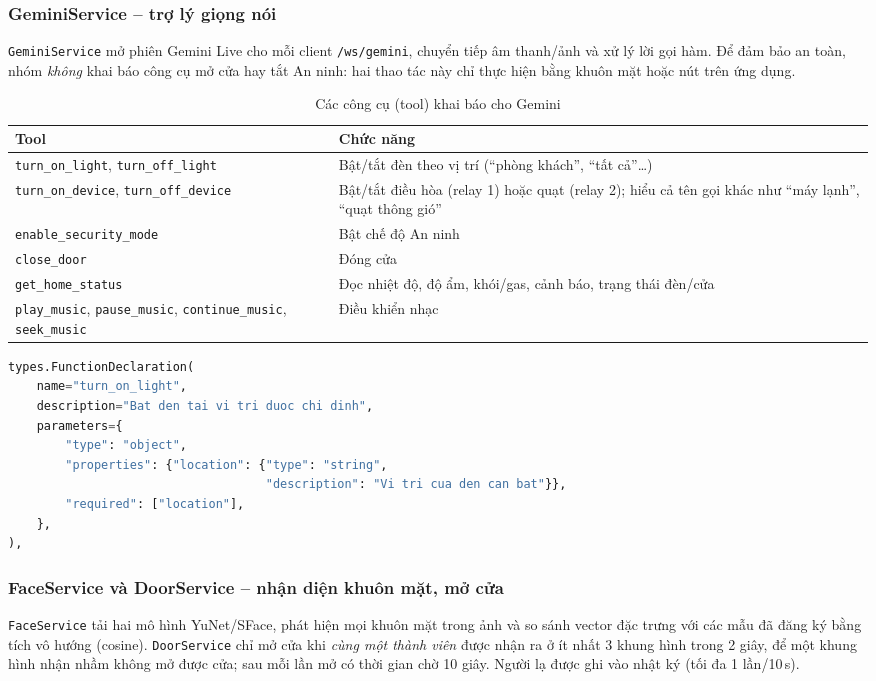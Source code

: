 \documentclass[12pt,a4paper]{extarticle}
\newcommand{\hang}{}  %
\begin{document}
\subsubsection{GeminiService -- trợ lý giọng nói}
\texttt{GeminiService} mở phiên Gemini Live cho mỗi client \texttt{/ws/gemini}, chuyển tiếp âm thanh/ảnh và xử lý lời gọi hàm. Để đảm bảo an toàn, nhóm \emph{không} khai báo công cụ mở cửa hay tắt An ninh: hai thao tác này chỉ thực hiện bằng khuôn mặt hoặc nút trên ứng dụng.

\begin{table}[H]
\centering
\begin{tabularx}{\linewidth}{|p{4.4cm}|L|}
\hline
\hang \textbf{Tool} & \textbf{Chức năng} \\ \hline
\texttt{turn\_on\_light}, \texttt{turn\_off\_light} & Bật/tắt đèn theo vị trí (``phòng khách'', ``tất cả''\ldots) \\ \hline
\texttt{turn\_on\_device}, \texttt{turn\_off\_device} & Bật/tắt điều hòa (relay 1) hoặc quạt (relay 2); hiểu cả tên gọi khác như ``máy lạnh'', ``quạt thông gió'' \\ \hline
\texttt{enable\_security\_mode} & Bật chế độ An ninh \\ \hline
\texttt{close\_door} & Đóng cửa \\ \hline
\texttt{get\_home\_status} & Đọc nhiệt độ, độ ẩm, khói/gas, cảnh báo, trạng thái đèn/cửa \\ \hline
\texttt{play\_music}, \texttt{pause\_music}, \texttt{continue\_music}, \texttt{seek\_music} & Điều khiển nhạc \\ \hline
\end{tabularx}
\caption{Các công cụ (tool) khai báo cho Gemini}
\label{tab:tools}
\end{table}

\begin{lstlisting}[language=Python]
types.FunctionDeclaration(
    name="turn_on_light",
    description="Bat den tai vi tri duoc chi dinh",
    parameters={
        "type": "object",
        "properties": {"location": {"type": "string",
                                    "description": "Vi tri cua den can bat"}},
        "required": ["location"],
    },
),
\end{lstlisting}

\subsubsection{FaceService và DoorService -- nhận diện khuôn mặt, mở cửa}
\texttt{FaceService} tải hai mô hình YuNet/SFace, phát hiện mọi khuôn mặt trong ảnh và so sánh vector đặc trưng với các mẫu đã đăng ký bằng tích vô hướng (cosine). \texttt{DoorService} chỉ mở cửa khi \emph{cùng một thành viên} được nhận ra ở ít nhất 3 khung hình trong 2 giây, để một khung hình nhận nhầm không mở được cửa; sau mỗi lần mở có thời gian chờ 10 giây. Người lạ được ghi vào nhật ký (tối đa 1 lần/10\,s).
\end{document}
